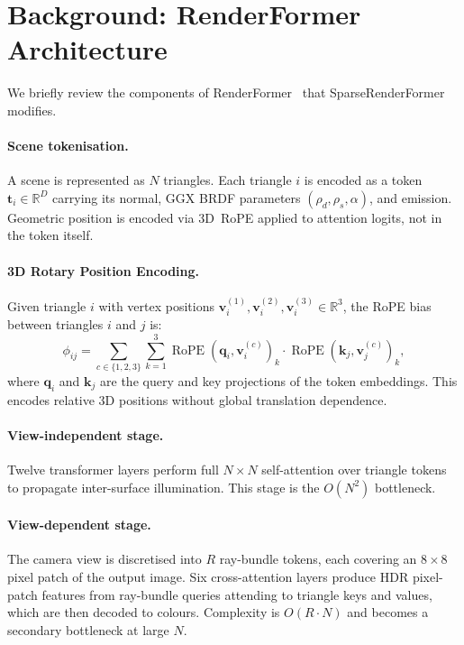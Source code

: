 \documentclass{egpubl}
\newcommand{\ours}{SparseRenderFormer\xspace}
\newcommand{\RF}{RenderFormer\xspace}
\begin{document}
\section{Background: \RF Architecture}
\label{sec:background}

We briefly review the components of \RF~\cite{zeng2025renderformer} that
\ours modifies.

\paragraph{Scene tokenisation.}
A scene is represented as $N$ triangles.
Each triangle $i$ is encoded as a token $\mathbf{t}_i \in \mathbb{R}^D$
carrying its normal, GGX BRDF parameters $(\rho_d, \rho_s, \alpha)$, and
emission.
Geometric position is encoded via 3D~RoPE applied to attention logits,
not in the token itself.

\paragraph{3D Rotary Position Encoding.}
Given triangle $i$ with vertex positions
$\mathbf{v}_i^{(1)}, \mathbf{v}_i^{(2)}, \mathbf{v}_i^{(3)} \in \mathbb{R}^3$,
the RoPE bias between triangles $i$ and $j$ is:
\begin{equation}
  \phi_{ij} = \sum_{c \in \{1,2,3\}} \sum_{k=1}^{3}
  \operatorname{RoPE}\!\left(\mathbf{q}_i, \mathbf{v}_i^{(c)}\right)_k \cdot
  \operatorname{RoPE}\!\left(\mathbf{k}_j, \mathbf{v}_j^{(c)}\right)_k,
  \label{eq:rope3d}
\end{equation}
where $\mathbf{q}_i$ and $\mathbf{k}_j$ are the query and key projections
of the token embeddings.
This encodes relative 3D positions without global translation dependence.

\paragraph{View-independent stage.}
Twelve transformer layers perform full $N \times N$ self-attention over
triangle tokens to propagate inter-surface illumination.
This stage is the $O(N^2)$ bottleneck.

\paragraph{View-dependent stage.}
The camera view is discretised into $R$ ray-bundle tokens, each covering
an $8 \times 8$ pixel patch of the output image.
Six cross-attention layers produce HDR pixel-patch features from ray-bundle
queries attending to triangle keys and values, which are then decoded to colours.
Complexity is $O(R \cdot N)$ and becomes a secondary bottleneck at large $N$.
\end{document}
